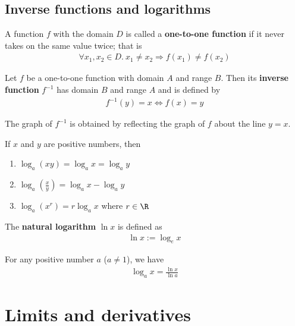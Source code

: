 \documentclass{article}
\begin{document}
\subsection{Inverse functions and logarithms}
\begin{definition}
	A function $f$ with the domain $D$ is called a \textbf{one-to-one function} if it never takes on the same value twice; that is
	\begin{align*}
		\forall x_1, x_2 \in D.\: x_1\not=x_2 \Rightarrow f(x_1)\not= f(x_2)
	\end{align*}
\end{definition}
\begin{definition}
	Let $f$ be a one-to-one function with domain $A$ and range $B$. Then its \textbf{inverse function} $f^{-1}$ has domain $B$ and range $A$ and is defined by
	\begin{align*}
		f^{-1}(y) = x \Leftrightarrow f(x) = y
	\end{align*}
\end{definition}
\begin{theorem}
	The graph of $f^{-1}$ is obtained by reflecting the graph of $f$ about the line $y=x$.
\end{theorem}
\begin{theorem}
	If $x$ and $y$ are positive numbers, then
	\begin{enumerate}
		\item $\log_a(xy)=\log_ax=\log_ay$
		\item $\log_a(\frac{x}{y}) = \log_ax - \log_ay$
		\item $\log_a(x^r)=r\log_ax$ where $r\in\R$
	\end{enumerate}
\end{theorem}
\begin{definition}
	The \textbf{natural logarithm} $\ln x$ is defined as
	\begin{align*}
		\ln x := \log_e x
	\end{align*}
\end{definition}
\begin{theorem}
	For any positive number $a$ ($a\not=1$), we have
	\begin{align*}
		\log_a x = \frac{\ln x}{\ln a}
	\end{align*}
\end{theorem}
\section{Limits and derivatives}
\setcounter{subsection}{1}
\end{document}
